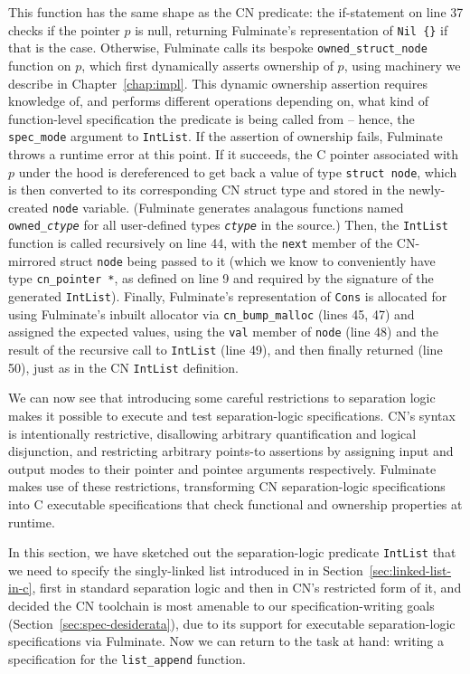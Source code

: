 This function has the same shape as the CN predicate: the if-statement on line 37 checks if the pointer $p$ is null, returning Fulminate's representation of \texttt{Nil \{\}} if that is the case. Otherwise, Fulminate calls its bespoke \texttt{owned\_struct\_node} function on $p$, which first dynamically asserts ownership of $p$, using machinery we describe in Chapter~\ref{chap:impl}. This dynamic ownership assertion requires knowledge of, and performs different operations depending on, what kind of function-level specification the predicate is being called from -- hence, the \texttt{spec\_mode} argument to \texttt{IntList}. If the assertion of ownership fails, Fulminate throws a runtime error at this point. If it succeeds, the C pointer associated with $p$ under the hood is dereferenced to get back a value of type \texttt{struct node}, which is then converted to its corresponding CN struct type and stored in the newly-created \texttt{node} variable. (Fulminate generates analagous functions named \texttt{owned\_\textit{ctype}} for all user-defined types \texttt{\textit{ctype}} in the source.) Then, the \texttt{IntList} function is called recursively on line 44, with the \texttt{next} member of the CN-mirrored struct \texttt{node} being passed to it (which we know to conveniently have type \texttt{cn\_pointer *}, as defined on line 9 and required by the signature of the generated \texttt{IntList}). Finally, Fulminate's representation of \texttt{Cons} is allocated for using Fulminate's inbuilt allocator via \texttt{cn\_bump\_malloc} (lines 45, 47) and assigned the expected values, using the \texttt{val} member of \texttt{node} (line 48) and the result of the recursive call to \texttt{IntList} (line 49), and then finally returned (line 50), just as in the CN \texttt{IntList} definition.

\bigskip

We can now see that introducing some careful restrictions to separation logic makes it possible to execute and test separation-logic specifications. CN's syntax is intentionally restrictive, disallowing arbitrary quantification and logical disjunction, and restricting arbitrary points-to assertions by assigning input and output modes to their pointer and pointee arguments respectively. Fulminate makes use of these restrictions, transforming CN separation-logic specifications into C executable specifications that check functional and ownership properties at runtime.

In this section, we have sketched out the separation-logic predicate \texttt{IntList} that we need to specify the singly-linked list introduced in in Section~\ref{sec:linked-list-in-c}, first in standard separation logic and then in CN's restricted form of it, and decided the CN toolchain is most amenable to our specification-writing goals (Section~\ref{sec:spec-desiderata}), due to its support for executable separation-logic specifications via Fulminate. Now we can return to the task at hand: writing a specification for the \texttt{list\_append} function.


